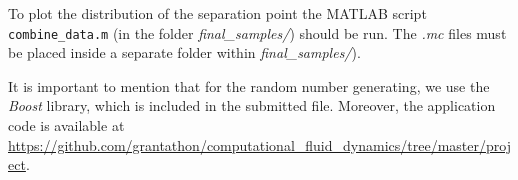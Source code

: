 \documentclass[12pt,a4paper]{article}
\begin{document}
\par To plot the distribution of the separation point the MATLAB script \texttt{combine\_data.m} (in the folder \emph{final\_samples/}) should be run. The \emph{\*.mc} files must be placed inside a separate folder within \emph{final\_samples/}).

It is important to mention that for the random number generating, we use the \emph{Boost} library, which is included in the submitted file. Moreover, the application code is available at \url{https://github.com/grantathon/computational_fluid_dynamics/tree/master/project}.
\end{document}
